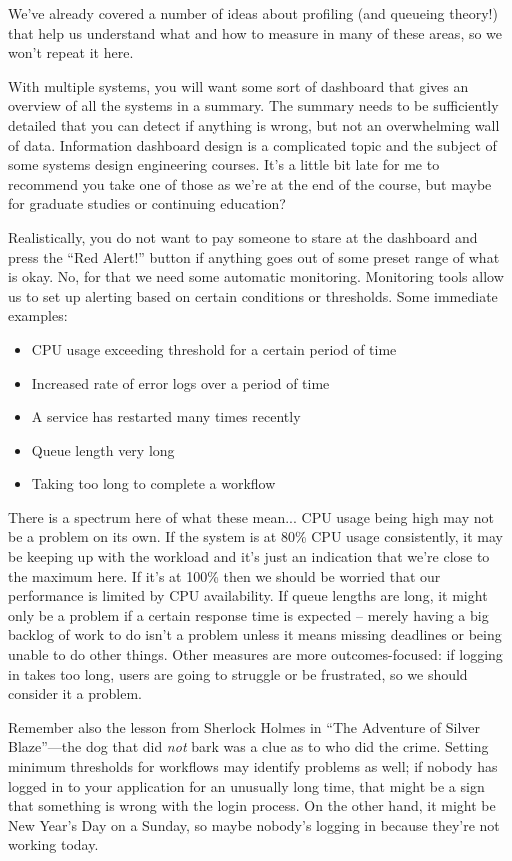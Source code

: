 We've already covered a number of ideas about profiling (and queueing theory!) that help us understand what and how to measure in many of these areas, so we won't repeat it here.

With multiple systems, you will want some sort of dashboard that gives an overview of all the systems in a summary. The summary needs to be sufficiently detailed that you can detect if anything is wrong, but not an overwhelming wall of data. Information dashboard design is a complicated topic and the subject of some systems design engineering courses. It's a little bit late for me to recommend you take one of those as we're at the end of the course, but maybe for graduate studies or continuing education?

Realistically, you do not want to pay someone to stare at the dashboard and press the  ``Red Alert!'' button if anything goes out of some preset range of what is okay. No, for that we need some automatic monitoring. Monitoring tools allow us to set up alerting based on certain conditions or thresholds. Some immediate examples:
\begin{itemize}
	\item CPU usage exceeding threshold for a certain period of time
	\item Increased rate of error logs over a period of time
	\item A service has restarted many times recently
	\item Queue length very long
	\item Taking too long to complete a workflow
\end{itemize}



There is a spectrum here of what these mean... CPU usage being high may not be a problem on its own. If the system is at 80\% CPU usage consistently, it may be keeping up with the workload and it's just an indication that we're close to the maximum here. If it's at 100\% then we should be worried that our performance is limited by CPU availability. If queue lengths are long, it might only be a problem if a certain response time is expected -- merely having a big backlog of work to do isn't a problem unless it means missing deadlines or being unable to do other things. Other measures are more outcomes-focused: if logging in takes too long, users are going to struggle or be frustrated, so we should consider it a problem.

Remember also the lesson from Sherlock Holmes in ``The Adventure of Silver Blaze''---the dog that did \textit{not} bark was a clue as to who did the crime. Setting minimum thresholds for workflows may identify problems as well; if nobody has logged in to your application for an unusually long time, that might be a sign that something is wrong with the login process. On the other hand, it might be New Year's Day on a Sunday, so maybe nobody's logging in because they're not working today.

